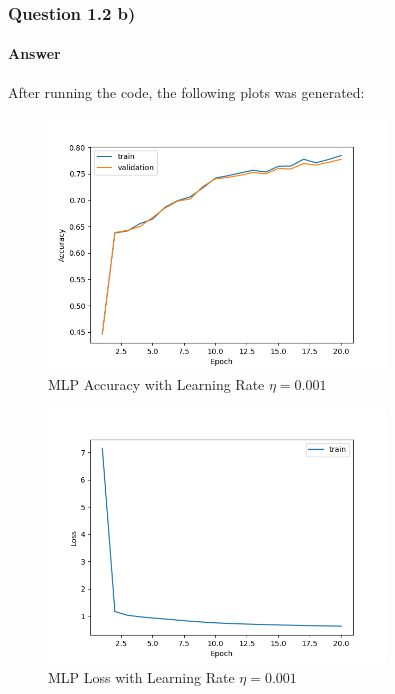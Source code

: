 \documentclass{article}
\begin{document}
\subsubsection{Question 1.2 b)}
\paragraph{Answer} After running the code, the following plots was generated:
\begin{figure}[H]
    \centering
    \includegraphics[width=0.8\textwidth]{"plots/mlp_validation_training.png"}
    \caption{MLP Accuracy with Learning Rate $\eta= 0.001$}
    \label{1.2.b 0.001 Plot}
\end{figure}


\begin{figure}[H]
    \centering
    \includegraphics[width=0.8\textwidth]{"plots/mlp_loss.png"}
    \caption{MLP Loss with Learning Rate $\eta= 0.001$}
    \label{1.2.b Loss Plot}
\end{figure}
\end{document}
